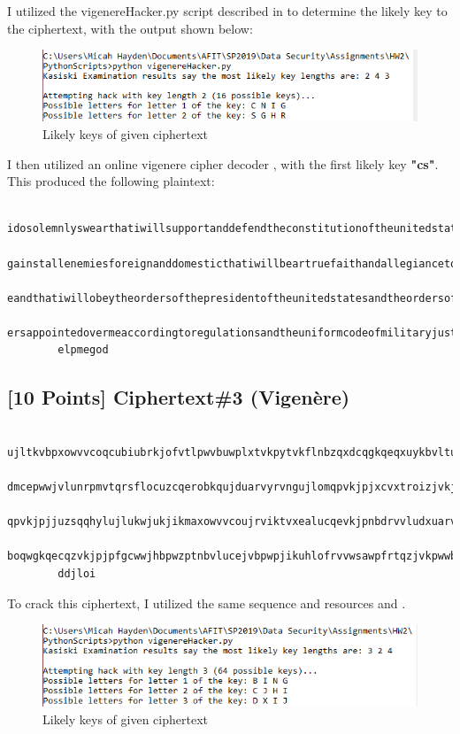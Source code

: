 \documentclass{article}
\begin{document}
I utilized the vigenereHacker.py script described in \cite{CrackingCodes} to determine the likely key to the ciphertext, with the output shown below:

\begin{figure}[h!]
\centering
\includegraphics[scale=1.0]{Images/run_HackVig_1.PNG}
\caption{Likely keys of given ciphertext}
\label{fig:vigOut_1}
\end{figure}

\newpage
I then utilized an online vigenere cipher decoder \cite{Web}, with the first likely key \textbf{"cs"}.
This produced the following plaintext:
	\begin{verbatim}
        idosolemnlyswearthatiwillsupportanddefendtheconstitutionoftheunitedstatesa
        gainstallenemiesforeignanddomesticthatiwillbeartruefaithandallegiancetothesam
        eandthatiwillobeytheordersofthepresidentoftheunitedstatesandtheordersoftheoffic
        ersappointedovermeaccordingtoregulationsandtheuniformcodeofmilitaryjusticesoh
        elpmegod
	\end{verbatim}
	
    \subsection*{[10 Points] Ciphertext\#3 (Vigen\`{e}re)}
    
    \begin{verbatim}
        ujltkvbpxowvvcoqcubiubrkjofvtlpwvbuwplxtvkpytvkflnbzqxdcqgkqeqxuykbvlturvpxtw
        dmcepwwjvlunrpmvtqrsflocuzcqerobkqujduarvyrvngujlomqpvkjpjxcvxtroizjvkjvlohddv
        qpvkjpjjuzsqqhylujlukwjukjikmaxowvvcoujrviktvxealucqevkjpnbdrvvludxuarvuwjnonc
        boqwgkqecqzvkjpjpfgcwwjhbpwzptnbvlucejvbpwpjikuhlofrvvwsawpfrtqzjvkpwwbpbdq
        ddjloi
    \end{verbatim}

To crack this ciphertext, I utilized the same sequence and resources \cite{CrackingCodes} and \cite{Web}.
\begin{figure}[h!]
\centering
\includegraphics[scale=1.0]{Images/run_HackVig_2.PNG}
\caption{Likely keys of given ciphertext}
\label{fig:vigOut_2}
\end{figure}
\end{document}
